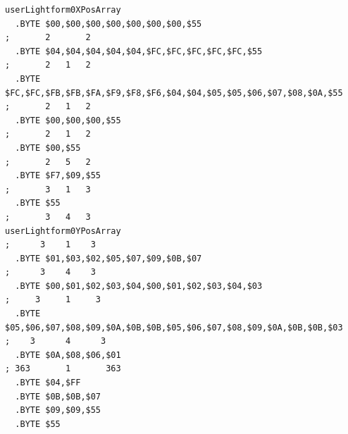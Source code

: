 \begin{minipage}[b]{0.48\linewidth}
\vspace{1cm}
\begin{lrbox}{\mybox}%
\hspace{1cm}
\begin{lstlisting}[basicstyle=\ttfamily\tiny,escapechar=\%]
userLightform0XPosArray
  .BYTE $00,$00,$00,$00,$00,$00,$00,$55                                        ;       2       2      
  .BYTE $04,$04,$04,$04,$04,$FC,$FC,$FC,$FC,$FC,$55                            ;       2   1   2      
  .BYTE $FC,$FC,$FB,$FB,$FA,$F9,$F8,$F6,$04,$04,$05,$05,$06,$07,$08,$0A,$55    ;       2   1   2      
  .BYTE $00,$00,$00,$55                                                        ;       2   1   2      
  .BYTE $00,$55                                                                ;       2   5   2      
  .BYTE $F7,$09,$55                                                            ;       3   1   3      
  .BYTE $55                                                                    ;       3   4   3      
userLightform0YPosArray                                                        ;      3    1    3     
  .BYTE $01,$03,$02,$05,$07,$09,$0B,$07                                        ;      3    4    3     
  .BYTE $00,$01,$02,$03,$04,$00,$01,$02,$03,$04,$03                            ;     3     1     3    
  .BYTE $05,$06,$07,$08,$09,$0A,$0B,$0B,$05,$06,$07,$08,$09,$0A,$0B,$0B,$03    ;    3      4      3   
  .BYTE $0A,$08,$06,$01                                                        ; 363       1       363
  .BYTE $04,$FF
  .BYTE $0B,$0B,$07
  .BYTE $09,$09,$55                                                         
  .BYTE $55
\end{lstlisting}
\end{lrbox}%
\scalebox{0.8}{\usebox{\mybox}}

\end{minipage}
%
\clearpage


